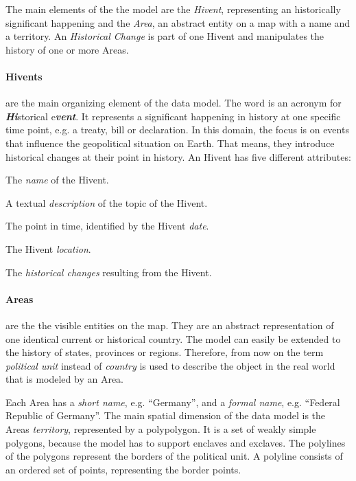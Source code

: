 The main elements of the the model are the \emph{Hivent}, representing an historically significant happening and the \emph{Area}, an abstract entity on a map with a name and a territory. An \emph{Historical Change} is part of one Hivent and manipulates the history of one or more Areas.

\paragraph{Hivents} %
\label{par:hivent}

are the main organizing element of the data model. The word is an acronym for \emph{\textbf{Hi}}storical e\emph{\textbf{vent}}. It represents a significant happening in history at one specific time point, e.g. a treaty, bill or declaration. In this domain, the focus is on events that influence the geopolitical situation on Earth. That means, they introduce historical changes at their point in history. An Hivent has five different attributes:

\begin{compactenum}
  \item The \emph{name} of the Hivent.
  \item A textual \emph{description} of the topic of the Hivent.
  \item The point in time, identified by the Hivent \emph{date}.
  \item The Hivent \emph{location}.
  \item The \emph{historical changes} resulting from the Hivent.
\end{compactenum}


\paragraph{Areas} %
\label{par:area}

are the the visible entities on the map. They are an abstract representation of one identical current or historical country. The model can easily be extended to the history of states, provinces or regions. Therefore, from now on the term \emph{political unit} instead of \emph{country} is used to describe the object in the real world that is modeled by an Area.

Each Area has a \emph{short name}, e.g. ``Germany'', and a \emph{formal name}, e.g. ``Federal Republic of Germany''. The main spatial dimension of the data model is the Areas \emph{territory}, represented by a polypolygon. It is a set of weakly simple polygons, because the model has to support enclaves and exclaves. The polylines of the polygons represent the borders of the political unit. A polyline consists of an ordered set of points, representing the border points.

